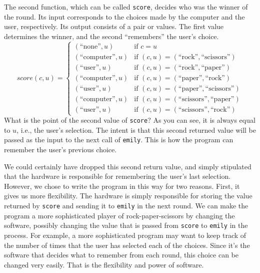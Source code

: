 The second function, which can be called \texttt{score}, decides who
was the winner of the round.  Its input corresponds to the choices
made by the computer and the user, respectively.  Its output consists
of a pair or values.  The first value determines the winner, and the
second ``remembers'' the user's choice.
\begin{displaymath}
score(c,u) =
   \left\{
        \begin{array}{ll}
        (\mbox{``none''}, u)     & \mbox{if } c = u \\
        (\mbox{``computer''}, u) & \mbox{if } (c,u) = (\mbox{``rock''}, \mbox{``scissors''}) \\
        (\mbox{``user''}, u)     & \mbox{if } (c,u) = (\mbox{``rock''}, \mbox{``paper''}) \\
        (\mbox{``computer''}, u) & \mbox{if } (c,u) = (\mbox{``paper''}, \mbox{``rock''}) \\
        (\mbox{``user''}, u)     & \mbox{if } (c,u) = (\mbox{``paper''}, \mbox{``scissors''}) \\
        (\mbox{``computer''}, u) & \mbox{if } (c,u) = (\mbox{``scissors''}, \mbox{``paper''}) \\
        (\mbox{``user''}, u)     & \mbox{if } (c,u) = (\mbox{``scissors''}, \mbox{``rock''})
        \end{array}     
   \right.
\end{displaymath}       
What is the point of the second value of \texttt{score}?  As you can
see, it is always equal to $u$, i.e., the user's selection.  The
intent is that this second returned value will be passed as the input
to the next call of \texttt{emily}.  This is how the program can
remember the user's previous choice.

We could certainly have dropped this second return value, and simply
stipulated that the hardware is responsible for remembering
the user's last selection.  However, we chose to write the program
in this way for two reasons.  First, it gives us more flexibility.
The hardware is simply responsible for storing the value returned 
by \texttt{score} and sending it to \texttt{emily} in the next round.
We can make the program a more sophisticated player of
rock-paper-scissors by changing the software, possibly changing the
value that is passed from \texttt{score} to \texttt{emily} in the
process.  For example, a more sophisticated program may want to
keep track of the number of times that the user has selected each of
the choices.  Since it's the software that decides what to remember
from each round, this choice can be changed very easily.  That is
the flexibility and power of software.

